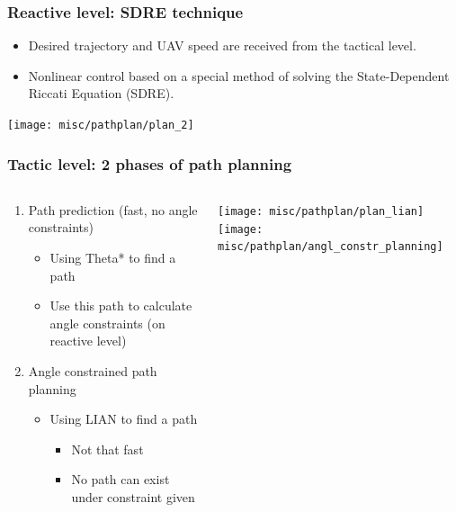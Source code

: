 \documentclass[default]{beamer}
\begin{document}
	\begin{frame}
		\frametitle{Reactive level: SDRE technique}
		\small
		\begin{itemize}
			\item Desired trajectory and UAV speed are received from the tactical level.
			\item Nonlinear control based on a special method of solving the State-Dependent Riccati Equation (SDRE).
			
		\end{itemize}
		\par\bigskip
		\centering
		\texttt{[image: misc/pathplan/plan\_2]}
		\nocite{*}
		\printbibliography[keyword={sdre}, resetnumbers=true]
	\end{frame}

	\begin{frame}
		\frametitle{Tactic level: 2 phases of path planning}
		\begin{columns}
			\begin{column}{0.7\textwidth}	
				\begin{enumerate}
					\item Path prediction (fast, no angle constraints)
					\begin{itemize}
						\item Using Theta* to find a path
						\item Use this path to calculate angle constraints (on reactive level)
					\end{itemize}
					\item Angle constrained path planning
					\begin{itemize}
						\item Using LIAN to find a path
						\begin{itemize}
							\item Not that fast
							\item No path can exist under constraint given
						\end{itemize}
					\end{itemize}
				\end{enumerate}
			\end{column}
			\begin{column}{0.3\textwidth}
				\centering
				\vspace{10pt}
				\texttt{[image: misc/pathplan/plan\_lian]}
				\vspace{10pt}
				\texttt{[image: misc/pathplan/angl\_constr\_planning]}
			\end{column}
		\end{columns}			
		\par\bigskip

		\nocite{*}
		\printbibliography[keyword={pathplan}, resetnumbers=true]

	\end{frame}
	
\end{document}
